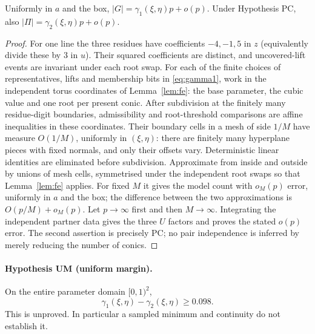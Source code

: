 

\begin{proposition}\label{prop:counts}
Uniformly in $a$ and the box, $|G|=\gamma_1(\xi,\eta)p+o(p)$.
Under Hypothesis PC, also $|\Pi|=\gamma_2(\xi,\eta)p+o(p)$.
\end{proposition}
\begin{proof}
For one line the three residues have coefficients $-4,-1,5$ in $z$ (equivalently divide these by $3$ in $u$).
Their squared coefficients are distinct, and uncovered-lift events are invariant under each root swap.
For each of the finite choices of representatives, lifts and membership bits in \eqref{eq:gamma1}, work in the independent torus coordinates
of Lemma~\ref{lem:fe}: the base parameter, the cubic value and one root per present conic.
After subdivision at the finitely many residue-digit boundaries, admissibility and root-threshold comparisons are affine inequalities in these coordinates.
Their boundary cells in a mesh of side $1/M$ have measure $O(1/M)$, uniformly in $(\xi,\eta)$: there are finitely many hyperplane pieces with fixed normals,
and only their offsets vary.  Deterministic linear identities are eliminated before subdivision.
Approximate from inside and outside by unions of mesh cells, symmetrised under the independent root swaps so that Lemma~\ref{lem:fe} applies.
For fixed $M$ it gives the model count with $o_M(p)$ error, uniformly in $a$ and the box; the difference between the two approximations is
$O(p/M)+o_M(p)$.  Let $p\to\infty$ first and then $M\to\infty$.  Integrating the independent partner data gives the three $U$ factors and proves the stated $o(p)$ error.
The second assertion is precisely PC; no pair independence is inferred by merely reducing the number of conics.
\end{proof}

\paragraph{Hypothesis UM (uniform margin).}\label{hyp:margin}
On the entire parameter domain $[0,1)^2$,
\begin{equation}\label{eq:margin}
 \gamma_1(\xi,\eta)-\gamma_2(\xi,\eta)\ge0.098.
\end{equation}
This is unproved.  In particular a sampled minimum and continuity do not establish it.

